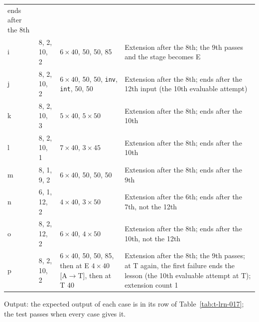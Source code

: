 \documentclass[12pt, titlepage]{article}
\begin{document}
\begin{enumerate}
\begin{table}[htbp]
\begin{tabularx}{\textwidth}{@{}l l >{\raggedright\arraybackslash}X
  >{\raggedright\arraybackslash}X@{}}
ends after the 8th\\
i & 8, 2, 10, 2 & $6 \times 40$, 50, 50, 85 & Extension after the 8th; the
9th passes and the stage becomes E\\
j & 8, 2, 10, 2 & $6 \times 40$, 50, 50, \texttt{inv}, \texttt{int}, 50, 50
& Extension after the 8th; ends after the 12th input (the 10th evaluable
attempt)\\
k & 8, 2, 10, 3 & $5 \times 40$, $5 \times 50$ & Extension after the 8th;
ends after the 10th\\
l & 8, 2, 10, 1 & $7 \times 40$, $3 \times 45$ & Extension after the 8th;
ends after the 10th\\
m & 8, 1, 9, 2 & $6 \times 40$, 50, 50, 50 & Extension after the 8th;
ends after the 9th\\
n & 6, 1, 12, 2 & $4 \times 40$, $3 \times 50$ & Extension after the 6th;
ends after the 7th, not the 12th\\
o & 8, 2, 12, 2 & $6 \times 40$, $4 \times 50$ & Extension after the 8th;
ends after the 10th, not the 12th\\
p & 8, 2, 10, 2 & $6 \times 40$, 50, 50, 85, then at E $4 \times 40$
[A$\to$T], then at T 40 & Extension after the 8th; the 9th passes; at T
again, the first failure ends the lesson (the 10th evaluable attempt at
T); extension count 1\\
\bottomrule
\end{tabularx}
\end{table}

Output: the expected output of each case is in its row of
Table~\ref{tab:t-lrn-017}; the test passes when every case gives it.


\end{enumerate}
\end{document}
